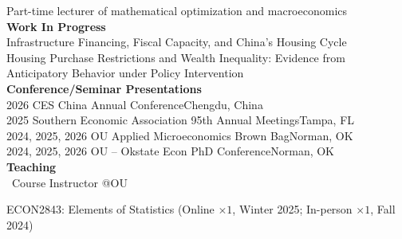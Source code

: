 \documentclass[10pt,letterpaper]{article}
\begin{document}
		Part-time lecturer of mathematical optimization and macroeconomics\medskip\\
	{\bf Work In Progress}\medskip\\
Infrastructure Financing, Fiscal Capacity, and China’s Housing Cycle\smallskip\\
Housing Purchase Restrictions and Wealth Inequality: Evidence from Anticipatory Behavior under Policy Intervention\smallskip\\
{\bf Conference/Seminar Presentations}\medskip\\
2026 CES China Annual Conference\hfill Chengdu, China\smallskip\\
2025 Southern Economic Association 95th Annual Meetings\hfill Tampa, FL\smallskip\\
2024, 2025, 2026 OU Applied Microeconomics Brown Bag\hfill Norman, OK\smallskip\\
2024, 2025, 2026 OU -- Okstate Econ PhD Conference\hfill Norman, OK\bigskip\\
{\bf Teaching}\medskip\\
{\ Course Instructor @OU}

ECON2843: Elements of Statistics (Online $\times 1$, Winter 2025; In-person $\times 1$, Fall 2024)
\end{document}
